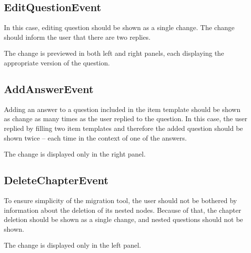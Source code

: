 \subsection*{EditQuestionEvent}

In this case, editing question should be shown as a single change.
The change should inform the user that there are two replies.

The change is previewed in both left and right panels, each displaying the appropriate version of the question.

\subsection*{AddAnswerEvent}

Adding an answer to a question included in the item template should be shown as change as many times as the user replied to the question.
In this case, the user replied by filling two item templates and therefore the added question should be shown twice -- each time in the context of one of the answers.

The change is displayed only in the right panel.

\subsection*{DeleteChapterEvent}

To ensure simplicity of the migration tool, the user should not be bothered by information about the deletion of its nested nodes.
Because of that, the chapter deletion should be shown as a single change, and nested questions should not be shown.

The change is displayed only in the left panel.
